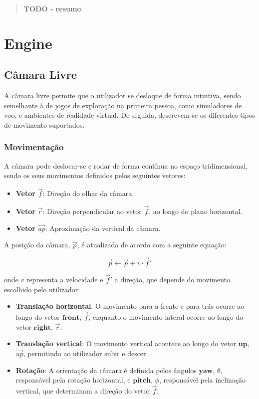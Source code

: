 \documentclass[12pt, a4paper]{article}
\begin{document}
\pagebreak

\begin{abstract}
    \textbf{\color{red} TODO - resumo}
\end{abstract}

\section{Engine}

\subsection{Câmara Livre}

A câmara livre permite que o utilizador se desloque de forma intuitiva, sendo semelhante à de
jogos de exploração na primeira pessoa, como simuladores de voo, e ambientes de realidade
virtual.
De seguida, descrevem-se os diferentes tipos de movimento suportados.

\subsubsection{Movimentação}

A câmara pode deslocar-se e rodar de forma contínua no espaço tridimensional, sendo os seus
movimentos definidos pelos seguintes vetores:

\begin{itemize}
    \item \textbf{Vetor} $\vec{f}$: Direção do olhar da câmara.
    \item \textbf{Vetor} $\vec{r}$: Direção perpendicular ao vetor $\vec{f}$, ao
          longo do plano horizontal.
    \item \textbf{Vetor} $\vec{up}$: Aproximação da vertical da câmara.
\end{itemize}

A posição da câmara, $\vec{p}$, é atualizada de acordo com a seguinte equação:

\[
\vec{p} \gets \vec{p} + v \cdot \vec{f}'
\]

onde $v$ representa a velocidade e $\vec{f}'$ a direção, que depende do movimento escolhido
pelo utilizador:

\begin{itemize}
    \item \textbf{Translação horizontal}: O movimento para a frente e para trás ocorre ao longo
          do vetor $\textbf{front}$, $\vec{f}$, enquanto o movimento lateral ocorre ao longo do
          vetor $\textbf{right}$, $\vec{r}$.
    \item \textbf{Translação vertical}: O movimento vertical acontece ao longo do vetor
          $\textbf{up}$, $\vec{up}$, permitindo ao utilizador subir e descer.
    \item \textbf{Rotação}: A orientação da câmara é definida pelos ângulos $\textbf{yaw}$,
          $\theta$, responsável pela rotação horizontal, e $\textbf{pitch}$, $\phi$, responsável
          pela inclinação vertical, que determinam a direção do vetor $\vec{f}$.
\end{itemize}
\end{document}
